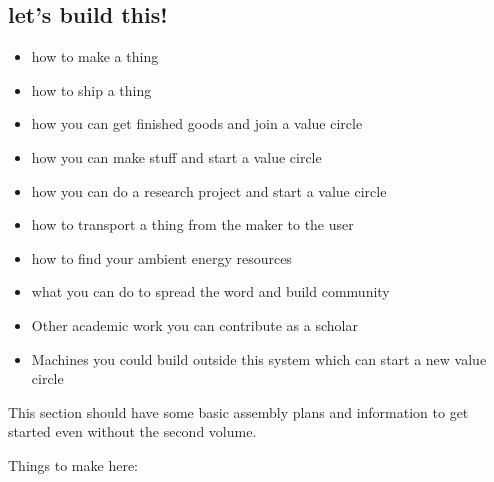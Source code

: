 \subsection{let's build this!}\label{lets-build-this}

\begin{itemize}
\tightlist
\item
  how to make a thing
\item
  how to ship a thing
\item
  how you can get finished goods and join a value circle
\item
  how you can make stuff and start a value circle
\item
  how you can do a research project and start a value circle
\item
  how to transport a thing from the maker to the user
\item
  how to find your ambient energy resources
\item
  what you can do to spread the word and build community
\item
  Other academic work you can contribute as a scholar
\item
  Machines you could build outside this system which can start a new
  value circle
\end{itemize}

This section should have some basic assembly plans and information to
get started even without the second volume.

Things to make here:

